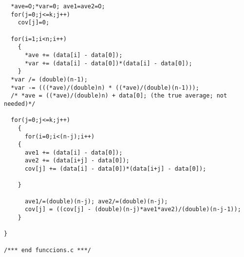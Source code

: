 {\begin{verbatim}
  *ave=O;*var=0; ave1=ave2=O;
  for(j=0;j<=k;j++)
    cov[j]=0;

  for(i=1;i<n;i++)
    {
      *ave += (data[i] - data[0]);
      *var += (data[i] - data[0])*(data[i] - data[0]);
    }
  *var /= (double)(n-1);
  *var -= (((*ave)/(double)n) * ((*ave)/(double)(n-1)));
  /* *ave = ((*ave)/(double)n) + data[0]; (the true average; not needed)*/

  for(j=0;j<=k;j++)
    {
      for(i=0;i<(n-j);i++)
	{
	  ave1 += (data[i] - data[0]);
	  ave2 += (data[i+j] - data[0]);
	  cov[j] += (data[i] - data[0])*(data[i+j] - data[0]);

	}

      ave1/=(double)(n-j); ave2/=(double)(n-j);
      cov[j] = ((cov[j] - (double)(n-j)*ave1*ave2)/(double)(n-j-1));
    }

}

/*** end funccions.c ***/

\end{verbatim}
}


